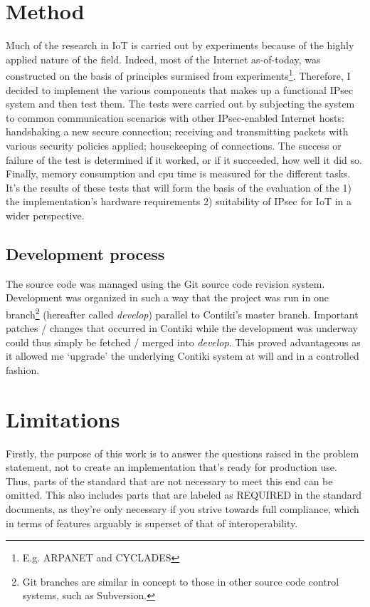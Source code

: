 \documentclass[final,a4paper,twoside,11pt,onecolumn]{report}
\begin{document}
\section{Method}
Much of the research in IoT is carried out by experiments because of the highly applied nature of the field. Indeed, most of the Internet as-of-today, was constructed on the basis of principles surmised from experiments\footnote{E.g. ARPANET and CYCLADES}. Therefore, I decided to implement the various components that makes up a functional IPsec system and then test them. The tests were carried out by subjecting the system to common communication scenarios with other IPsec-enabled Internet hosts: handshaking a new secure connection; receiving and transmitting packets with various security policies applied; housekeeping of connections. The success or failure of the test is determined if it worked, or if it succeeded, how well it did so. Finally, memory consumption and cpu time is measured for the different tasks. It's the results of these tests that will form the basis of the evaluation of the 1) the implementation's hardware requirements 2) suitability of IPsec for IoT in a wider perspective.

\subsection{Development process}
The source code was managed using the Git source code revision system. Development was organized in such a way that the project was run in one branch\footnote{Git branches are similar in concept to those in other source code control systems, such as Subversion.} (hereafter called \emph{develop}) parallel to Contiki's master branch. Important patches / changes that occurred in Contiki while the development was underway could thus simply be fetched / merged into \emph{develop}. This proved advantageous as it allowed me `upgrade' the underlying Contiki system at will and in a controlled fashion.

\section{Limitations}
Firstly, the purpose of this work is to answer the questions raised in the problem statement, not to create an implementation that's ready for production use. Thus, parts of the standard that are not necessary to meet this end can be omitted. This also includes parts that are labeled as REQUIRED in the standard documents, as they're only necessary if you strive towards full compliance, which in terms of features arguably is superset of that of interoperability.
\end{document}
